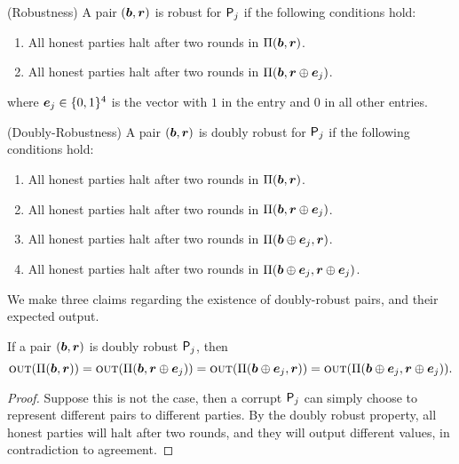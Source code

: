 \begin{definition}({Robustness})
	A pair $({ \boldsymbol{b}},{ \boldsymbol{r}})$ is \textsf{robust} for $\mathsf{P}_j$ if the following conditions hold:
	\begin{enumerate}
		\item All honest parties halt after two rounds in $\Pi({ \boldsymbol{b}},{ \boldsymbol{r}})$.
		\item All honest parties halt after two rounds in $\Pi({ \boldsymbol{b}},{ \boldsymbol{r}} \oplus { \boldsymbol{e}}_j)$.
	\end{enumerate}
	where ${ \boldsymbol{e}}_j \in \{0,1\}^4$ is the vector with $1$ in the \jth entry and $0$ in all other entries. 
\end{definition}

\begin{definition}({Doubly-Robustness})
	A pair $({ \boldsymbol{b}},{ \boldsymbol{r}})$ is \textsf{doubly robust} for $\mathsf{P}_j$ if the following conditions hold:
	\begin{enumerate}
		\item All honest parties halt after two rounds in $\Pi({ \boldsymbol{b}},{ \boldsymbol{r}})$.
		\item All honest parties halt after two rounds in $\Pi({ \boldsymbol{b}},{ \boldsymbol{r}} \oplus { \boldsymbol{e}}_j)$.
		\item All honest parties halt after two rounds in $\Pi({ \boldsymbol{b}} \oplus { \boldsymbol{e}}_j,{ \boldsymbol{r}})$.
		\item All honest parties halt after two rounds in $\Pi({ \boldsymbol{b}} \oplus { \boldsymbol{e}}_j,{ \boldsymbol{r}} \oplus { \boldsymbol{e}}_j)$.
	\end{enumerate}
\end{definition}

\noindent
We make three claims regarding the existence of doubly-robust  pairs, and their expected output.

\begin{claim}\label{clm:double_robust_means_same_output}
If a pair $({ \boldsymbol{b}},{ \boldsymbol{r}})$ is doubly robust \wrt $\mathsf{P}_j$, then 
\[
\textsc{out}(\Pi({ \boldsymbol{b}},{ \boldsymbol{r}})) = \textsc{out}(\Pi({ \boldsymbol{b}},{ \boldsymbol{r}} \oplus { \boldsymbol{e}}_j)) = \textsc{out}(\Pi({ \boldsymbol{b}} \oplus { \boldsymbol{e}}_j,{ \boldsymbol{r}})) = \textsc{out}(\Pi({ \boldsymbol{b}} \oplus { \boldsymbol{e}}_j,{ \boldsymbol{r}} \oplus { \boldsymbol{e}}_j)).
\]

\end{claim}

\begin{proof}
Suppose this is not the case, then a corrupt $\mathsf{P}_j$ can simply choose to represent different pairs to different parties. By the doubly robust property, all honest parties will halt after two rounds, and they will output different values, in contradiction to agreement.
\end{proof}

